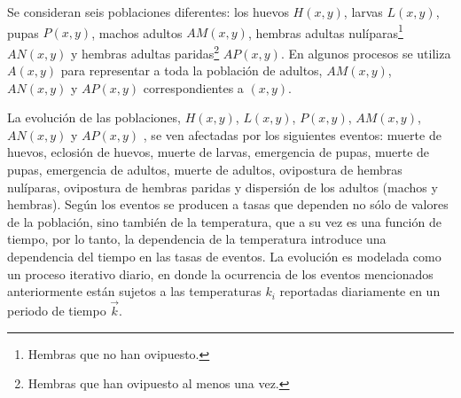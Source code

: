 Se consideran seis poblaciones diferentes: los huevos $H(x,y)$, larvas $L(x,y)$, pupas $P(x,y)$,
machos adultos $AM(x,y)$, hembras adultas nulíparas\footnote{Hembras que no han ovipuesto.}
$AN(x,y)$ y hembras adultas paridas\footnote{Hembras que han ovipuesto al menos una vez.} $AP(x,y)$. En algunos procesos se utiliza $A(x, y)$ para representar a toda la población de adultos,
$AM(x,y)$, $AN(x,y)$ y $AP(x,y)$ correspondientes a $(x, y)$.

La evolución de las poblaciones, $H(x,y)$, $L(x,y)$, $P(x,y)$, $AM(x,y)$, $AN(x,y)$ y $AP(x,y)$ ,
se ven afectadas por los siguientes eventos: muerte de huevos, eclosión de huevos, muerte de
larvas, emergencia de pupas, muerte de pupas, emergencia de adultos, muerte de adultos, ovipostura
de hembras nulíparas, ovipostura de hembras paridas y dispersión de los adultos (machos y hembras).
Según \cite{otero2006stochastic} los eventos se producen a tasas que dependen no sólo de valores
de la población, sino también de la temperatura, que a su vez es una función de tiempo, por lo
tanto, la dependencia de la temperatura introduce una dependencia del tiempo en las tasas de
eventos. La evolución es modelada como un proceso iterativo diario, en donde la ocurrencia de los
eventos mencionados anteriormente están sujetos a las temperaturas $k_{i}$ reportadas diariamente
en un periodo de tiempo $\vec{k}$.








